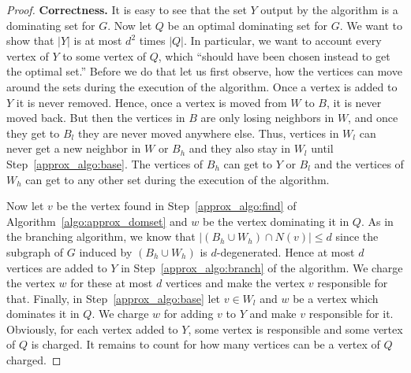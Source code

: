 \begin{proof}
 \noindent
{\bf Correctness.}
It is easy to see that the set $Y$ output by the algorithm is a dominating set for $G$. Now let $Q$ be an optimal dominating set for $G$. We want to show that $|Y|$ is at most $d^2$ times $|Q|$. In particular, we want to account every vertex of $Y$ to some vertex of $Q$, which ``should have been chosen instead to get the optimal set.'' Before we do that let us first observe, how the vertices can move around the sets during the execution of the algorithm. Once a vertex is added to $Y$ it is never removed. Hence, once a vertex is moved from $W$ to $B$, it is never moved back. But then the vertices in $B$ are only losing neighbors in $W$, and once they get to $B_l$ they are never moved anywhere else. Thus, vertices in $W_l$ can never get a new neighbor in $W$ or $B_h$ and they also stay in $W_l$ until Step~\ref{approx_algo:base}. The vertices of $B_h$ can get to $Y$ or $B_l$ and the vertices of $W_h$ can get to any other set during the execution of the algorithm.

Now let $v$ be the vertex found in Step~\ref{approx_algo:find} of Algorithm~\ref{algo:approx_domset} and $w$ be the vertex dominating it in $Q$. As in the branching algorithm, we know that $|(B_h \cup W_h)\cap N(v)| \leq d$ since the subgraph of $G$ induced by $(B_h \cup W_h)$ is $d$-degenerated. Hence at most $d$ vertices are added to $Y$ in Step~\ref{approx_algo:branch} of the algorithm. We charge the vertex $w$ for these at most $d$ vertices and make the vertex $v$ responsible for that. Finally, in Step~\ref{approx_algo:base} let $v \in W_l$ and $w$ be a vertex which dominates it in $Q$. We charge $w$ for adding $v$ to $Y$ and make $v$ responsible for it. Obviously, for each vertex added to $Y$, some vertex is responsible and some vertex of $Q$ is charged. It remains to count for how many vertices can be a vertex of $Q$ charged. 


\end{proof}
